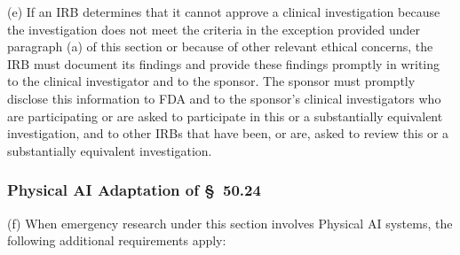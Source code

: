 \documentclass[11pt]{article}
\begin{document}
(e) If an IRB determines that it cannot approve a clinical investigation because the investigation does not meet the criteria in the exception provided under paragraph (a) of this section or because of other relevant ethical concerns, the IRB must document its findings and provide these findings promptly in writing to the clinical investigator and to the sponsor. The sponsor must promptly disclose this information to FDA and to the sponsor's clinical investigators who are participating or are asked to participate in this or a substantially equivalent investigation, and to other IRBs that have been, or are, asked to review this or a substantially equivalent investigation.

\subsubsection{Physical AI Adaptation of \S~50.24}

(f) When emergency research under this section involves Physical AI systems, the following additional requirements apply:
\end{document}
